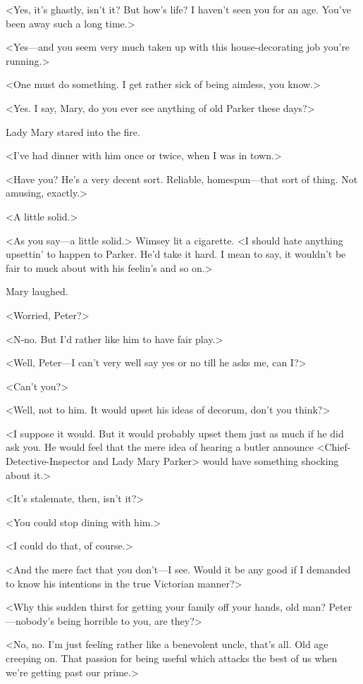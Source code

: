 <Yes, it's ghastly, isn't it? But how's life? I haven't seen you for an age. You've been away such a long time.>

<Yes—and you seem very much taken up with this house-decorating job you're running.>

<One must do something. I get rather sick of being aimless, you know.>

<Yes. I say, Mary, do you ever see anything of old Parker these days?>

Lady Mary stared into the fire.

<I've had dinner with him once or twice, when I was in town.>

<Have you? He's a very decent sort. Reliable, homespun—that sort of thing. Not amusing, exactly.>

<A little solid.>

<As you say—a little solid.> Wimsey lit a cigarette. <I should hate anything upsettin' to happen to Parker. He'd take it hard. I mean to say, it wouldn't be fair to muck about with his feelin's and so on.>

Mary laughed.

<Worried, Peter?>

<N-no. But I'd rather like him to have fair play.>

<Well, Peter—I can't very well say yes or no till he asks me, can I?>

<Can't you?>

<Well, not to him. It would upset his ideas of decorum, don't you think?>

<I suppose it would. But it would probably upset them just as much if he did ask you. He would feel that the mere idea of hearing a butler announce <Chief-Detective-Inspector and Lady Mary Parker> would have something shocking about it.>

<It's stalemate, then, isn't it?>

<You could stop dining with him.>

<I could do that, of course.>

<And the mere fact that you don't—I see. Would it be any good if I demanded to know his intentions in the true Victorian manner?>

<Why this sudden thirst for getting your family off your hands, old man? Peter—nobody's being horrible to you, are they?>

<No, no. I'm just feeling rather like a benevolent uncle, that's all. Old age creeping on. That passion for being useful which attacks the best of us when we're getting past our prime.>

